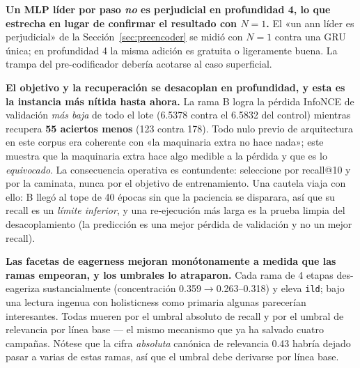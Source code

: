 \documentclass[11pt]{article}
\begin{document}
\textbf{Un MLP líder por paso \emph{no} es perjudicial en profundidad 4, lo que
estrecha en lugar de confirmar el resultado con $N=1$.} El «un ann líder es
perjudicial» de la Sección~\ref{sec:preencoder} se midió con $N=1$ contra una GRU
única; en profundidad 4 la misma adición es gratuita o ligeramente buena. La trampa
del pre-codificador debería acotarse al caso superficial.

\textbf{El objetivo y la recuperación se desacoplan en profundidad, y esta es la
instancia más nítida hasta ahora.} La rama B logra la pérdida InfoNCE de validación
\emph{más baja} de todo el lote (\num{6.5378} contra el \num{6.5832} del control)
mientras recupera \textbf{\num{55} aciertos menos} (\num{123} contra \num{178}).
Todo nulo previo de arquitectura en este corpus era coherente con «la maquinaria
extra no hace nada»; este muestra que la maquinaria extra hace algo medible a la
pérdida y que es lo \emph{equivocado}. La consecuencia operativa es contundente:
seleccione por recall@10 y por la caminata, nunca por el objetivo de entrenamiento.
Una cautela viaja con ello: B llegó al tope de \num{40} épocas sin que la paciencia
se disparara, así que su recall es un \emph{límite inferior}, y una re-ejecución más
larga es la prueba limpia del desacoplamiento (la predicción es una mejor pérdida de
validación y no un mejor recall).

\textbf{Las facetas de eagerness mejoran monótonamente a medida que las ramas
empeoran, y los umbrales lo atraparon.} Cada rama de 4 etapas des-eageriza
sustancialmente (concentración \num{0.359}$\to$\numrange{0.263}{0.318}) y eleva
\texttt{ild}; bajo una lectura ingenua con holisticness como primaria algunas
parecerían interesantes. Todas mueren por el umbral absoluto de recall y por el
umbral de relevancia por línea base --- el mismo mecanismo que ya ha salvado cuatro
campañas. Nótese que la cifra \emph{absoluta} canónica de relevancia \num{0.43}
habría dejado pasar a varias de estas ramas, así que el umbral debe derivarse por
línea base.
\end{document}
